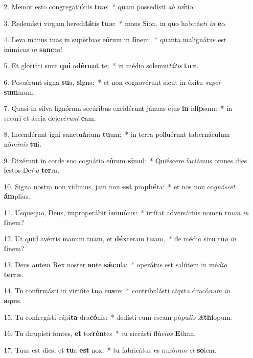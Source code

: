 2. Memor esto congregati\textbf{ó}nis \textbf{tu}æ:~*  quam possedísti \textit{ab} \textit{in}\textbf{í}tio.\

3. Redemísti virgam heredi\textbf{tá}tis \textbf{tu}æ:~*  mons Sion, in quo habitás\textit{ti} \textit{in} \textbf{e}o.\

4. Leva manus tuas in supérbias e\textbf{ó}rum in \textbf{fi}nem:~*  quanta malignátus est inimí\textit{cus} \textit{in} \textbf{sanc}to!\

5. Et gloriáti sunt \textbf{qui} o\textbf{dé}\textbf{runt} te:~*  in médio solemni\textit{tá}\textit{tis} \textbf{tu}æ.\

6. Posuérunt signa \textbf{su}a, \textbf{si}gna:~*  et non cognovérunt sicut in éxitu \textit{su}\textit{per} \textbf{sum}mum.\

7. Quasi in silva lignórum secúribus excidérunt jánuas ejus \textbf{in} id\textbf{íp}sum:~*  in secúri et áscia deje\textit{cé}\textit{runt} \textbf{e}am.\

8. Incendérunt igni sanctu\textbf{á}rium \textbf{tu}um:~*  in terra polluérunt tabernáculum nó\textit{mi}\textit{nis} \textbf{tu}i.\

9. Dixérunt in corde suo cognátio e\textbf{ó}rum \textbf{si}mul:~*  Quiéscere faciámus omnes dies festos De\textit{i} \textit{a} \textbf{ter}ra.\

10. Signa nostra non vídimus, jam non \textbf{est} pro\textbf{phé}ta:~*  et nos non co\textit{gnó}\textit{scet} \textbf{ám}plius.\

11. Usquequo, Deus, improperábit \textbf{in}i\textbf{mí}cus:~*  irrítat adversárius nomen tu\textit{um} \textit{in} \textbf{fi}nem?\

12. Ut quid avértis manum tuam, et \textbf{déx}teram \textbf{tu}am,~*  de médio sinu tu\textit{o} \textit{in} \textbf{fi}nem?\

13. Deus autem Rex noster \textbf{an}te \textbf{sǽ}\textbf{cu}la:~*  operátus est salútem in mé\textit{di}\textit{o} \textbf{ter}ræ.\

14. Tu confirmásti in virtúte \textbf{tu}a \textbf{ma}re:~*  contribulásti cápita dracó\textit{num} \textit{in} \textbf{a}quis.\

15. Tu confregísti cápi\textbf{ta} dra\textbf{có}nis:~*  dedísti eum escam pópu\textit{lis} \textit{Æ}\textbf{thí}opum.\

16. Tu dirupísti fontes, \textbf{et} tor\textbf{rén}tes~*  tu siccásti flú\textit{vi}\textit{os} \textbf{E}than.\

17. Tuus est dies, et \textbf{tu}a \textbf{est} nox:~*  tu fabricátus es auró\textit{ram} \textit{et} \textbf{so}lem.\

